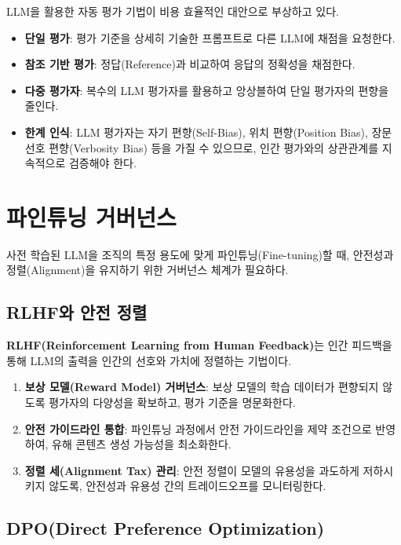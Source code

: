 LLM을 활용한 자동 평가 기법이 비용 효율적인 대안으로 부상하고 있다.

\begin{itemize}
 \item \textbf{단일 평가}: 평가 기준을 상세히 기술한 프롬프트로 다른 LLM에 채점을 요청한다.
 \item \textbf{참조 기반 평가}: 정답(Reference)과 비교하여 응답의 정확성을 채점한다.
 \item \textbf{다중 평가자}: 복수의 LLM 평가자를 활용하고 앙상블하여 단일 평가자의 편향을 줄인다.
 \item \textbf{한계 인식}: LLM 평가자는 자기 편향(Self-Bias), 위치 편향(Position Bias), 장문 선호 편향(Verbosity Bias) 등을 가질 수 있으므로, 인간 평가와의 상관관계를 지속적으로 검증해야 한다.
\end{itemize}

\section{파인튜닝 거버넌스}
\label{sec:gen.2.5}

사전 학습된 LLM을 조직의 특정 용도에 맞게 파인튜닝(Fine-tuning)할 때, 안전성과 정렬(Alignment)을 유지하기 위한 거버넌스 체계가 필요하다.

\subsection{RLHF와 안전 정렬}

\textbf{RLHF(Reinforcement Learning from Human Feedback)}는 인간 피드백을 통해 LLM의 출력을 인간의 선호와 가치에 정렬하는 기법이다.

\begin{enumerate}
 \item \textbf{보상 모델(Reward Model) 거버넌스}: 보상 모델의 학습 데이터가 편향되지 않도록 평가자의 다양성을 확보하고, 평가 기준을 명문화한다.
 \item \textbf{안전 가이드라인 통합}: 파인튜닝 과정에서 안전 가이드라인을 제약 조건으로 반영하여, 유해 콘텐츠 생성 가능성을 최소화한다.
 \item \textbf{정렬 세(Alignment Tax) 관리}: 안전 정렬이 모델의 유용성을 과도하게 저하시키지 않도록, 안전성과 유용성 간의 트레이드오프를 모니터링한다.
\end{enumerate}

\subsection{DPO(Direct Preference Optimization)}

